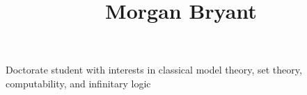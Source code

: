 \documentclass[a4paper]{article}
\title{Morgan Bryant}
\date{}
\begin{document}
\maketitle
\par{Doctorate student with interests in classical model theory, set theory, computability, and infinitary logic}
\printbibliography
\end{document}
